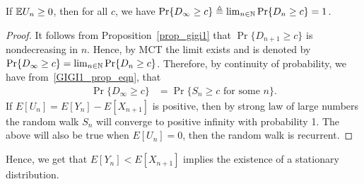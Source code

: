 \documentclass[a4paper,10pt,english]{article}
\begin{document}
\begin{cor} If $\mathbb{E} U_n \geq 0$, then for all $c$, we have 
$\Pr\{D_{\infty} \geq c\} \triangleq \lim_{n \in \mathbb{N}}\Pr\{D_{n} \geq c\} = 1$.
\end{cor}
\begin{proof}
It follows from Proposition~\ref{prop_gigi1} that $\Pr\{D_{n+1} \geq c\}$ is nondecreasing in $n$. Hence, by MCT the limit exists and is denoted by $\Pr\{D_{\infty} \geq c\}=\lim_{n \in \mathbb{N}}\Pr\{D_{n} \geq c\}$. Therefore, by continuity of probability, we have from~\eqref{GIGI1_prop_eqn}, that
\begin{align}
\label{random_walk_gigi1}
\Pr\{D_{\infty} \geq c\} &= \Pr\{S_n \geq c \text{ for some }n\}.
\end{align}
If $E[U_n]=E[Y_n]-E[X_{n+1}]$ is positive, then by strong law of large numbers the random walk $S_n$ will converge to positive infinity with probability 1. 
The above will also be true when $E[U_n] = 0$, then the random walk is recurrent.
\end{proof}
\begin{rem} Hence, we get that $E[Y_n]< E[X_{n+1}]$ implies the existence of a stationary distribution.
\end{rem}
\end{document}
